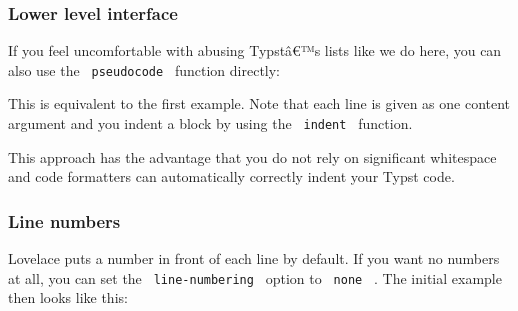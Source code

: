 \pandocbounded{}

\subsubsection{Lower level interface}\label{lower-level-interface}

If you feel uncomfortable with abusing Typstâ€™s lists like we do here,
you can also use the \texttt{\ pseudocode\ } function directly:

\begin{Shaded}
\begin{Highlighting}[]
\NormalTok{  [do something],}
\NormalTok{    ),}
\NormalTok{    [*else*],}
\NormalTok{      [go home],}
\NormalTok{    ),}
\NormalTok{    [*end*],}
\NormalTok{  ),}
\NormalTok{  [*end*],}
\NormalTok{)}
\end{Highlighting}
\end{Shaded}

This is equivalent to the first example. Note that each line is given as
one content argument and you indent a block by using the
\texttt{\ indent\ } function.

This approach has the advantage that you do not rely on significant
whitespace and code formatters can automatically correctly indent your
Typst code.

\subsubsection{Line numbers}\label{line-numbers}

Lovelace puts a number in front of each line by default. If you want no
numbers at all, you can set the \texttt{\ line-numbering\ } option to
\texttt{\ none\ } . The initial example then looks like this:

\begin{Shaded}
\begin{Highlighting}[]
\NormalTok{\#pseudocode{-}list(line{-}numbering: none)[}
\NormalTok{]}
\end{Highlighting}
\end{Shaded}

